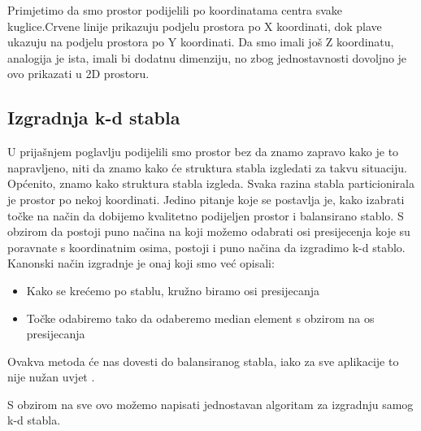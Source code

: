 Primjetimo da smo prostor podijelili po koordinatama centra svake kuglice.Crvene linije prikazuju podjelu prostora po X koordinati, dok plave ukazuju na podjelu prostora po Y koordinati. Da smo imali još Z koordinatu, analogija je ista, imali bi dodatnu dimenziju, no zbog jednostavnosti dovoljno je ovo prikazati u 2D prostoru.\newpage

\subsection{Izgradnja k-d stabla}
U prijašnjem poglavlju podijelili smo prostor bez da znamo zapravo kako je to napravljeno, niti da znamo kako će struktura stabla izgledati za takvu situaciju. Općenito, znamo kako struktura stabla izgleda. Svaka razina stabla particionirala je prostor po nekoj koordinati. Jedino pitanje koje se postavlja je, kako izabrati točke na način da dobijemo kvalitetno podijeljen prostor i balansirano stablo. S obzirom da postoji puno načina na koji možemo odabrati osi presijecenja koje su poravnate s koordinatnim osima, postoji i puno načina da izgradimo k-d stablo. Kanonski način izgradnje je onaj koji smo već opisali\cite{14}:
\begin{itemize}
	\item Kako se krećemo po stablu, kružno biramo osi presijecanja
	\item Točke odabiremo tako da odaberemo median element s obzirom na os presijecanja
\end{itemize}
Ovakva metoda će nas dovesti do balansiranog stabla, iako za sve aplikacije to nije nužan uvjet \cite{14}.

S obzirom na sve ovo možemo napisati jednostavan algoritam za izgradnju samog k-d stabla.

